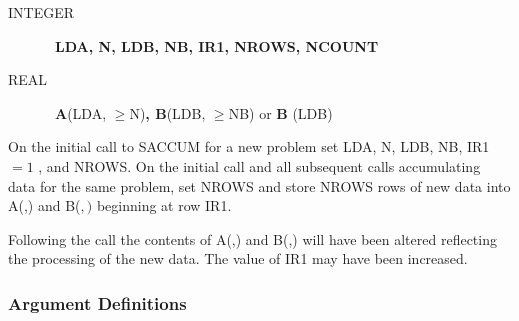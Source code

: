 \documentclass[twoside]{MATH77}
\begin{document}
\begin{description}
\item[INTEGER]  \ {\bf LDA, N, LDB, NB, IR1, NROWS, NCOUNT}

\item[REAL]  \ {\bf A}(LDA, $\geq $N){\bf , B}(LDB, $\geq $NB) or {\bf B}%
(LDB)
\end{description}

On the initial call to SACCUM for a new problem set LDA, N, LDB, NB, IR1$= 1$%
, and NROWS. On the initial call and all subsequent calls accumulating data
for the same problem, set NROWS and store NROWS rows of new data into A(,)
and B($,)$ beginning at row IR1.

\begin{center}
\end{center}

Following the call the contents of A(,) and B(,) will have been altered
reflecting the processing of the new data. The value of IR1 may have been
increased.

\subsubsection{Argument Definitions}
\end{document}
